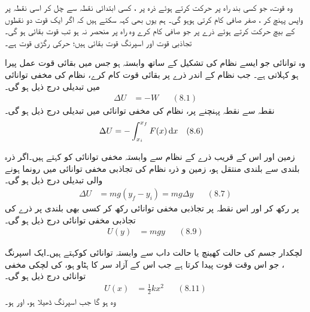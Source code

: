 وہ قوت،  جو کسی بند راہ  پر حرکت کرتے ہوئے ذرہ پر ، کسی ابتدائی نقطہ سے چل کر اسی نقطہ پر واپس پہنچ کر ، صفر صافی  کام کرتی ہوہو گی۔ ہم یوں بھی کہہ سکتے ہیں کہ  اگر ایک قوت  دو نقطوں کے بیچ حرکت کرتے ہوئے ذرے پر  جو صافی    کام کرے وہ  راہ پر منحصر نہ ہو تب  قوت بقائی ہو گی۔ تجاذبی قوت اور اسپرنگ قوت بقائی ہیں؛ حرکی رگڑی قوت  ہے۔

وہ توانائی جو  ایسے نظام کی تشکیل کے ساتھ  وابستہ ہو جس میں بقائی قوت عمل پیرا ہو  کہلاتی ہے۔ جب نظام کے اندر ذرے پر بقائی قوت   کام   کرے، نظام کی مخفی توانائی میں  تبدیلی   درج ذیل ہو گی۔
\begin{align*}
\Delta U&=-W &&(8.1)
\end{align*}
نقطہ  سے نقطہ   پہنچنے پر، نظام کی مخفی توانائی میں تبدیلی درج ذیل ہو گی۔
\begin{align*}
\Delta U&=-\int_{x_i}^{x_f}F(x)\dif x&&(8.6)
\end{align*}

زمین اور اس کے قریب ذرے کے نظام سے وابستہ  مخفی توانائی کو کہتے ہیں۔اگر ذرہ   بلندی سے  بلندی منتقل ہو، زمین و ذرہ نظام کی تجاذبی مخفی توانائی میں رونما ہونے والی تبدیلی درج ذیل ہو گی۔
\begin{align*}
\Delta U&=mg(y_f-y_i)=mg\Delta y && (8.7)
\end{align*}
  پر رکھ کر اور اس نقطہ پر تجاذبی مخفی توانائی  رکھ کر کسی بھی بلندی  پر ذرے کی تجاذبی مخفی توانائی درج ذیل ہو گی۔
\begin{align*}
U(y)&=mgy && (8.9)
\end{align*}

لچکدار جسم کی  حالت کھینچ یا حالت داب  سے وابستہ توانائی کوکہتے ہیں۔ایک   اسپرنگ    ، جو اس وقت  قوت  پیدا کرتا ہے جب اس کے آزاد سر کا ہٹاو  ہو، کی لچکی مخفی توانائی درج ذیل ہو گی۔
\begin{align*}
U(x)&=\frac{1}{2}kx^2 && (8.11)
\end{align*}
وہ ہو گا جب اسپرنگ ڈھیلا ہو،   اور  ہو۔

